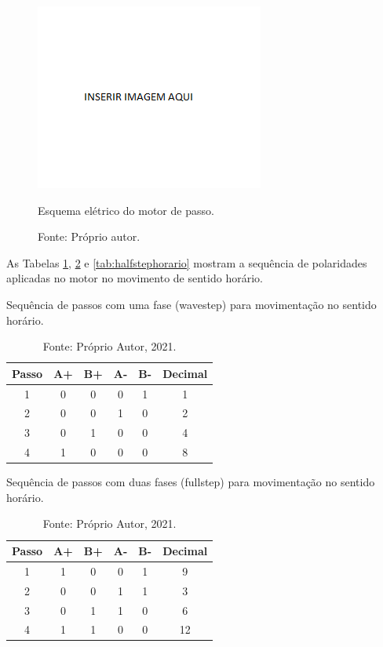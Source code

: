 \begin{figure}[!htb]
\centering
\includegraphics[scale = 0.2]{figuras/3-16}
\caption{Esquema elétrico do motor de passo.}
\caption*{Fonte: Próprio autor.}
\label{fig:esquemaeletrico}
\end{figure}
    
As Tabelas \ref{tab:wavestephorario}, \ref{tab:fullstephorario} e \ref{tab:halfstephorario} 
mostram a sequência de polaridades aplicadas no motor no movimento de sentido horário.

\begin{table}
    \centering
    \caption{Sequência de passos com uma fase (wavestep) para movimentação no sentido horário.}
    \begin{tabular}{cccccc}
        \hline
        \textbf{Passo} & \textbf{A+} & \textbf{B+} & \textbf{A-} & \textbf{B-} & \textbf{Decimal}\\
        \hline
        1 & 0 & 0 & 0 & 1 & 1\\
        2 & 0 & 0 & 1 & 0 & 2\\
        3 & 0 & 1 & 0 & 0 & 4\\
        4 & 1 & 0 & 0 & 0 & 8\\        
        \hline       
    \end{tabular}
    \caption*{Fonte: Próprio Autor, 2021.}
    \label{tab:wavestephorario}
\end{table}

\begin{table}
    \centering
    \caption{Sequência de passos com duas fases (fullstep) para movimentação no sentido horário.}
    \begin{tabular}{cccccc}
        \hline
        \textbf{Passo} & \textbf{A+} & \textbf{B+} & \textbf{A-} & \textbf{B-} & \textbf{Decimal}\\
        \hline
        1 & 1 & 0 & 0 & 1 & 9\\
        2 & 0 & 0 & 1 & 1 & 3\\
        3 & 0 & 1 & 1 & 0 & 6\\
        4 & 1 & 1 & 0 & 0 & 12\\
        \hline       
    \end{tabular}
    \caption*{Fonte: Próprio Autor, 2021.}
    \label{tab:fullstephorario}
\end{table}

